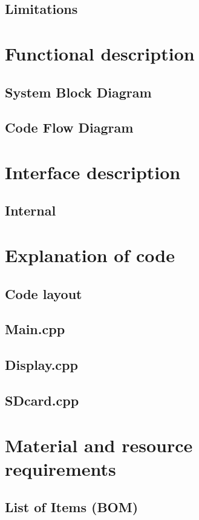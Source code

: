 \documentclass[11pt]{article}
\begin{document}
\subsection{Limitations}

\section{Functional description}
\subsection{System Block Diagram}
\subsection{Code Flow Diagram}

\section{Interface description}
\subsection{Internal}

\section{Explanation of code}
\subsection{Code layout}
\subsection{Main.cpp}
\subsection{Display.cpp}
\subsection{SDcard.cpp}


\section{Material and resource requirements}
\subsection{List of Items (BOM)}
\end{document}
